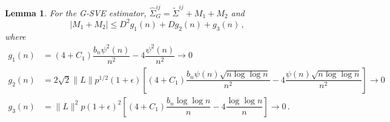 \documentclass[11pt]{article}
\newtheorem{lemma}{Lemma}
\theoremstyle{remark}
\begin{document}
\begin{lemma} \label{lemma:G-SVE_breakdown}
For the G-SVE estimator, $\hat{\Sigma}_{G}^{ij} = \tilde{\Sigma}^{ij} + M_1 + M_2$ and 
\[
|M_1 + M_2| \leq D^2 g_1(n) + D g_2(n) + g_3(n)\,,
\]
where
\begin{align*}
    g_1(n) &= (4+C_1)\dfrac{b_n \psi^2(n)}{n^2} - 4\dfrac{\psi^2(n)}{n^2} \to 0\\
    g_2(n) &= 2\sqrt{2}\|L\|p^{1/2}(1+\epsilon)\left[(4+C_1)\dfrac{b_n\psi(n)\sqrt{n\log \log n}}{n^2} - 4\dfrac{\psi(n)\sqrt{n\log \log n}}{n^2}\right] \to 0\\
    g_3(n) &= \|L\|^2 p (1+\epsilon)^2\left[(4+C_1)\dfrac{b_n \log\log n}{n} - 4 \dfrac{\log \log n}{n}\right] \to 0\,.
\end{align*}
\end{lemma}
\end{document}

